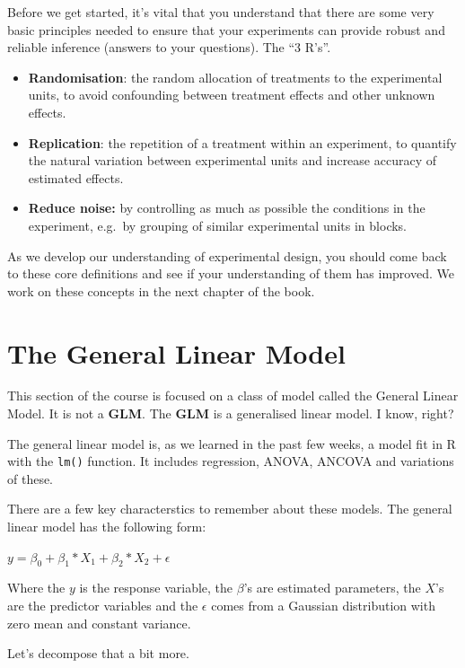 \documentclass[
]{book}
\providecommand{\tightlist}{%
  \setlength{\itemsep}{0pt}\setlength{\parskip}{0pt}}
\begin{document}
Before we get started, it's vital that you understand that there are some very basic principles needed to ensure that your experiments can provide robust and reliable inference (answers to your questions). The ``3 R's''.

\begin{itemize}
\tightlist
\item
  \textbf{Randomisation}: the random allocation of treatments to the experimental units, to avoid confounding between treatment effects and other unknown effects.
\item
  \textbf{Replication}: the repetition of a treatment within an experiment, to quantify the natural variation between experimental units and increase accuracy of estimated effects.
\item
  \textbf{Reduce noise:} by controlling as much as possible the conditions in the experiment, e.g.~by grouping of similar experimental units in blocks.
\end{itemize}

As we develop our understanding of experimental design, you should come back to these core definitions and see if your understanding of them has improved. We work on these concepts in the next chapter of the book.

\hypertarget{the-general-linear-model}{%
\section{The General Linear Model}\label{the-general-linear-model}}

This section of the course is focused on a class of model called the General Linear Model. It is not a \textbf{GLM}. The \textbf{GLM} is a generalised linear model. I know, right?

The general linear model is, as we learned in the past few weeks, a model fit in R with the \texttt{lm()} function. It includes regression, ANOVA, ANCOVA and variations of these.

There are a few key characterstics to remember about these models. The general linear model has the following form:

\(y = \beta_{0}+\beta_{1}*X_{1}+\beta_{2}*X_{2}+\epsilon\)

Where the \(y\) is the response variable, the \(\beta\)'s are estimated parameters, the \(X\)'s are the predictor variables and the \(\epsilon\) comes from a Gaussian distribution with zero mean and constant variance.

Let's decompose that a bit more.
\end{document}
